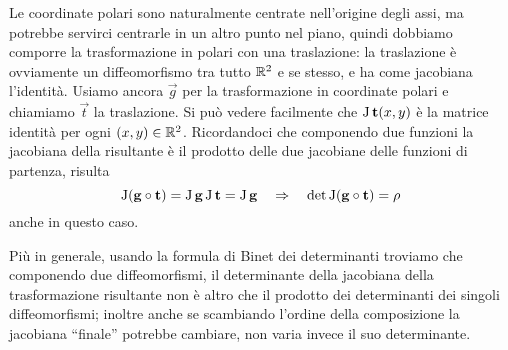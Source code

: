 \begin{esempio} \label{es:composizione-polari-traslazione}
	Le coordinate polari sono naturalmente centrate nell'origine degli assi, ma potrebbe servirci centrarle in un altro punto nel piano, quindi dobbiamo comporre la trasformazione in polari con una traslazione: la traslazione è ovviamente un diffeomorfismo tra tutto $\mathbb{R}^2$ e se stesso, e ha come jacobiana l'identità.
	Usiamo ancora $\vec g$ per la trasformazione in coordinate polari e chiamiamo $\vec t$ la traslazione.
	Si può vedere facilmente che $\operatorname{J}\mathbf{t}(x,y)$ è la matrice identità per ogni $(x,y)\in\mathbb{R}^2$.
	Ricordandoci che componendo due funzioni la jacobiana della risultante è il prodotto delle due jacobiane delle funzioni di partenza, risulta
	\begin{equation}
		\operatorname{J}(\mathbf{g}\circ\mathbf{t})=\operatorname{J}\mathbf{g}\operatorname{J}\mathbf{t}=\operatorname{J}\mathbf{g}\quad\Rightarrow\quad\det\operatorname{J}(\mathbf{g}\circ\mathbf{t})=\rho
	\end{equation}
	anche in questo caso.
\end{esempio}
Più in generale, usando la formula di Binet dei determinanti troviamo che componendo due diffeomorfismi, il determinante della jacobiana della trasformazione risultante non è altro che il prodotto dei determinanti dei singoli diffeomorfismi; inoltre anche se scambiando l'ordine della composizione la jacobiana ``finale'' potrebbe cambiare, non varia invece il suo determinante.
